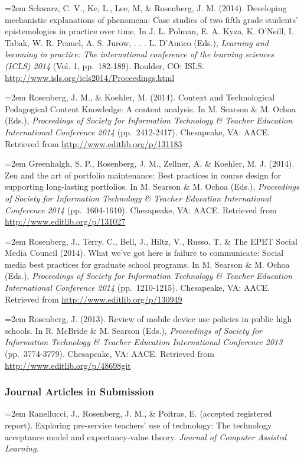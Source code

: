 \documentclass[14,]{article}
\begin{document}
\hangindent=2em Schwarz, C. V., Ke, L., Lee, M, \& Rosenberg, J. M.
(2014). Developing mechanistic explanations of phenomena: Case studies
of two fifth grade students' epistemologies in practice over time. In J.
L. Polman, E. A. Kyza, K. O'Neill, I. Tabak, W. R. Penuel, A. S. Jurow,
. . . L. D'Amico (Eds.), \emph{Learning and becoming in practice: The
international conference of the learning sciences (ICLS) 2014} (Vol. 1,
pp.~182-189). Boulder, CO: ISLS.
\url{http://www.isls.org/icls2014/Proceedings.html}

\hangindent=2em Rosenberg, J. M., \& Koehler, M. (2014). Context and
Technological Pedagogical Content Knowledge: A content analysis. In M.
Searson \& M. Ochoa (Eds.), \emph{Proceedings of Society for Information
Technology \& Teacher Education International Conference 2014}
(pp.~2412-2417). Chesapeake, VA: AACE. Retrieved from
\url{http://www.editlib.org/p/131183}

\hangindent=2em Greenhalgh, S. P., Rosenberg, J. M., Zellner, A. \&
Koehler, M. J. (2014). Zen and the art of portfolio maintenance: Best
practices in course design for supporting long-lasting portfolios. In M.
Searson \& M. Ochoa (Eds.), \emph{Proceedings of Society for Information
Technology \& Teacher Education International Conference 2014}
(pp.~1604-1610). Chesapeake, VA: AACE. Retrieved from
\url{http://www.editlib.org/p/131027}

\hangindent=2em Rosenberg, J., Terry, C., Bell, J., Hiltz, V., Russo, T.
\& The EPET Social Media Council (2014). What we've got here is failure
to communicate: Social media best practices for graduate school
programs. In M. Searson \& M. Ochoa (Eds.), \emph{Proceedings of Society
for Information Technology \& Teacher Education International Conference
2014} (pp.~1210-1215). Chesapeake, VA: AACE. Retrieved from
\url{http://www.editlib.org/p/130949}

\hangindent=2em Rosenberg, J. (2013). Review of mobile device use
policies in public high schools. In R. McBride \& M. Searson (Eds.),
\emph{Proceedings of Society for Information Technology \& Teacher
Education International Conference 2013} (pp.~3774-3779). Chesapeake,
VA: AACE. Retrieved from \url{http://www.editlib.org/p/48698git}

\subsubsection{Journal Articles in
Submission}\label{journal-articles-in-submission}

\hangindent=2em Ranellucci, J., Rosenberg, J. M., \& Poitras, E.
(accepted registered report). Exploring pre-service teachers' use of
technology: The technology acceptance model and expectancy-value theory.
\emph{Journal of Computer Assisted Learning}.
\end{document}
